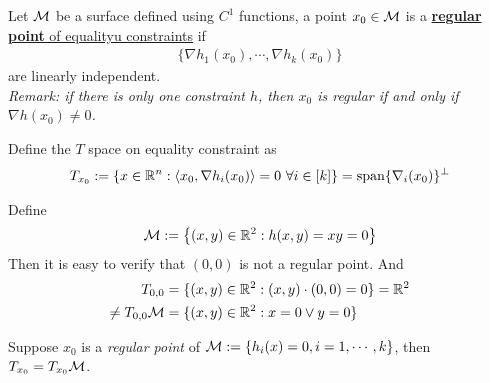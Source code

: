 \documentclass{article}
\begin{document}
   	\begin{definition}
   		Let $\mathcal{{M}}$ be a surface defined using $C^1$ functions, a point $x_0 \in \mathcal{{M}}$ is a \ul{\textbf{regular point} of equalityu constraints} if 
   		\begin{align}
   			\{\nabla h_1(x_0), \cdots, \nabla h_k(x_0)\}
   		\end{align}
   		are linearly independent. \\
   		\emph{Remark: if there is only one constraint $h$, then $x_0$ is regular if and only if $\nabla h(x_0) \neq 0$.}
   	\end{definition}
   	
   	\begin{notation}
   		Define the $T$ space on equality constraint as
   		\begin{align}
   			T_{x_0} := \{x \in \R^n: \inner{x_0}{\nabla h_i(x_0)} = 0\ \forall i \in [k]\} = \tx{span} \{\nabla_i(x_0)\}^\perp
   		\end{align}
   	\end{notation}
   	
   	\begin{example}
   		Define
   		\begin{align}
   			\mathcal{{M}} := \left \{
   			(x, y) \in \mathbb{R}^2:
   			h(x,y) = xy = 0
   			\right \}
   		\end{align}
   		Then it is easy to verify that $(0,0)$ is not a regular point. And
   		\begin{align}
   			T_{0,0} &= \{(x, y) \in \mathbb{R}^2: (x, y) \cdot (0,0) = 0\} = \mathbb{R}^2 \\
   			\neq T_{0,0}\mathcal{{M}} &= \{(x, y) \in \mathbb{R}^2: x = 0 \lor y = 0\}
   		\end{align}
   	\end{example}
   	
   	\begin{theorem}
   		Suppose $x_0$ is a \emph{regular point} of $\mathcal{{M}} := \{h_i(x) = 0, i=1,\cdots,k\}$, then $T_{x_0} = T_{x_0} \mathcal{{M}}$.
   	\end{theorem}
   	
\end{document}
